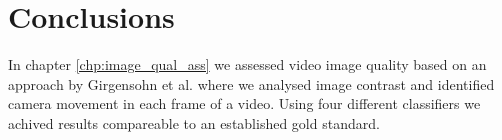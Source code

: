 %
%
\chapter{Conclusions}
%
%
%
%
In chapter \ref{chp:image_qual_ass} we assessed video image quality based on an approach by Girgensohn et al.\cite{Girgensohn:2000:SAH:354401.354415} where we analysed image contrast and identified camera movement in each frame of a video. Using four different classifiers we achived results compareable to an established gold standard.
%

